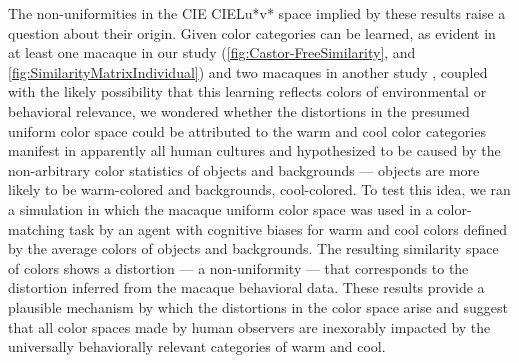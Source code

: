 The non-uniformities in the CIE CIELu*v* space implied by these results raise a question about their origin. 
Given color categories can be learned, as evident in at least one macaque in our study (\autoref{fig:Castor-FreeSimilarity}, and \autoref{fig:SimilarityMatrixIndividual}) and two macaques in another study%
, coupled with the likely possibility that this learning reflects colors of environmental or behavioral relevance, we wondered whether the distortions in the presumed uniform color space could be attributed to the warm and cool color categories manifest in apparently all human cultures %
and hypothesized to be caused by the non-arbitrary color statistics of objects and backgrounds %
— objects are more likely to be warm-colored and backgrounds, cool-colored. 
To test this idea, we ran a simulation in which the macaque uniform color space was used in a color-matching task by an agent with cognitive biases for warm and cool colors defined by the average colors of objects and backgrounds. 
The resulting similarity space of colors shows a distortion — a non-uniformity — that corresponds to the distortion inferred from the macaque behavioral data. 
These results provide a plausible mechanism by which the distortions in the color space arise and suggest that all color spaces made by human observers are inexorably impacted by the universally behaviorally relevant categories of warm and cool. 




